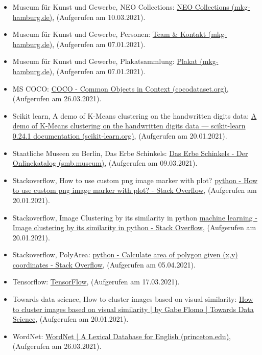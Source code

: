 \documentclass[a4paper,12pt,ngerman]{article}
\begin{document}
\begin{itemize}
\item Museum für Kunst und Gewerbe, NEO Collections: \href{https://www.mkg-hamburg.de/de/das-mkg/neo-collections.html}{NEO Collections (mkg-hamburg.de)}, (Aufgerufen am 10.03.2021).
\item Museum für Kunst und Gewerbe, Personen: \href{https://www.mkg-hamburg.de/de/das-mkg/team-kontakt.html}{Team \& Kontakt (mkg-hamburg.de)}, (Aufgerufen am 07.01.2021).
\item Museum für Kunst und Gewerbe, Plakatsammlung: \href{https://www.mkg-hamburg.de/de/sammlung/sammlungen/plakat.html}{Plakat (mkg-hamburg.de)}, (Aufgerufen am 07.01.2021).
\item MS COCO: \href{https://cocodataset.org/\#home}{COCO - Common Objects in Context (cocodataset.org)}, (Aufgerufen am 26.03.2021).
\item Scikit learn, A demo of K-Means clustering on the handwritten digits data: \href{https://scikit-learn.org/stable/auto\_examples/cluster/plot\_kmeans\_digits.html\#sphx-glr-auto-examples-cluster-plot-kmeans-digits-py}{A demo of K-Means clustering on the handwritten digits data — scikit-learn 0.24.1 documentation (scikit-learn.org)}, (Aufgerufen am 20.01.2021).
\item Staatliche Museen zu Berlin, Das Erbe Schinkels: \href{http://schinkel.smb.museum/index.php?page_id=25}{Das Erbe Schinkels - Der Onlinekatalog (smb.museum)}, (Aufgerufen am 09.03.2021).
\item Stackoverflow, How to use custom png image marker with plot? \href{https://stackoverflow.com/questions/2318288/how-to-use-custom-png-image-marker-with-plot}{python - How to use custom png image marker with plot? - Stack Overflow}, (Aufgerufen am 20.01.2021).
\item Stackoverflow, Image Clustering by its similarity in python \href{https://stackoverflow.com/questions/39123421/image-clustering-by-its-similarity-in-python}{machine learning - Image clustering by its similarity in python - Stack Overflow}, (Aufgerufen am 20.01.2021).
\item Stackoverflow, PolyArea: \href{https://stackoverflow.com/questions/24467972/calculate-area-of-polygon-given-x-y-coordinates}{python - Calculate area of polygon given (x,y) coordinates - Stack Overflow}, (Aufgerufen am 05.04.2021).
\item Tensorflow: \href{https://www.tensorflow.org/}{TensorFlow}, (Aufgerufen am 17.03.2021).
\item Towards data science, How to cluster images based on visual similarity: \href{https://towardsdatascience.com/how-to-cluster-images-based-on-visual-similarity-cd6e7209fe34}{How to cluster images based on visual similarity | by Gabe Flomo | Towards Data Science}, (Aufgerufen am 20.01.2021).
\item WordNet: \href{https://wordnet.princeton.edu/}{WordNet | A Lexical Database for English (princeton.edu)}, (Aufgerufen am 26.03.2021).
\end{itemize}
\end{document}
